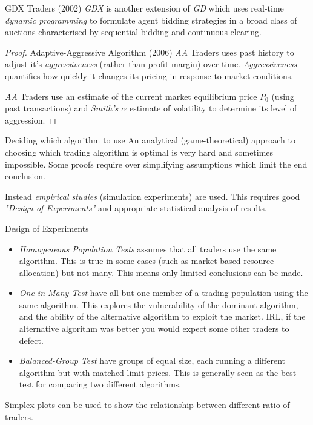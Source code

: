 \documentclass[11pt,a4paper]{article}
\begin{document}
\begin{proposition}{GDX Traders (2002)}
  \textit{GDX} is another extension of \textit{GD} which uses real-time \textit{dynamic programming} to formulate agent bidding strategies in a broad class of auctions characterised by sequential bidding and continuous clearing.
\end{proposition}

\begin{proof}{Adaptive-Aggressive Algorithm (2006)}
  \textit{AA} Traders uses past history to adjust it's \textit{aggressiveness} (rather than profit margin) over time. \textit{Aggressiveness} quantifies how quickly it changes its pricing in response to market conditions.
  \par \textit{AA} Traders use an estimate of the current market equilibrium price $P_0$ (using past transactions) and \textit{Smith's $\alpha$} estimate of volatility to determine its level of aggression.
\end{proof}

\begin{proposition}{Deciding which algorithm to use}
  An analytical (game-theoretical) approach to choosing which trading algorithm is optimal is very hard and sometimes impossible. Some proofs require over simplifying assumptions which limit the end conclusion.
  \par Instead \textit{empirical studies} (simulation experiments) are used. This requires good \textit{"Design of Experiments"} and appropriate statistical analysis of results.
\end{proposition}

\begin{proposition}{Design of Experiments}
  \begin{itemize}
    \item \textit{Homogeneous Population Tests} assumes that all traders use the same algorithm. This is true in some cases (such as market-based resource allocation) but not many. This means only limited conclusions can be made.
    \item \textit{One-in-Many Test} have all but one member of a trading population using the same algorithm. This explores the vulnerability of the dominant algorithm, and the ability of the alternative algorithm to exploit the market. IRL, if the alternative algorithm was better you would expect some other traders to defect.
    \item \textit{Balanced-Group Test} have groups of equal size, each running a different algorithm but with matched limit prices. This is generally seen as the best test for comparing two different algorithms.
  \end{itemize}
  Simplex plots can be used to show the relationship between different ratio of traders.
\end{proposition}
\end{document}
